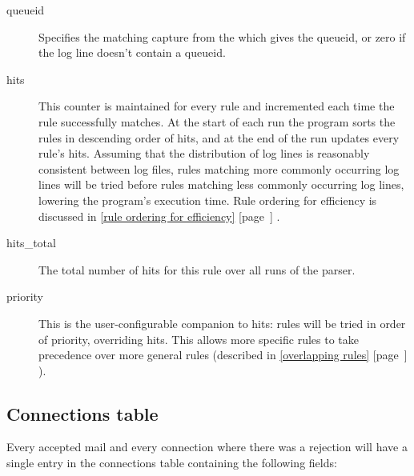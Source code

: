 \documentclass[a4paper,12pt,draft]{article}
\newcommand{\refwithpage}[1]{%
    \empty{}\ref{#1} [page~\pageref{#1}]%
}
\newcommand{\sectionref}[1]{%
    \textsection{}\refwithpage{#1}%
}
\begin{document}
\begin{description}
    \item [queueid] Specifies the matching capture from the \regex{} which
        gives the queueid, or zero if the log line doesn't contain a
        queueid.

    \item [hits] This counter is maintained for every rule and incremented
        each time the rule successfully matches.  At the start of each run
        the program sorts the rules in descending order of hits, and at the
        end of the run updates every rule's hits.  Assuming that the
        distribution of log lines is reasonably consistent between log
        files, rules matching more commonly occurring log lines will be
        tried before rules matching less commonly occurring log lines,
        lowering the program's execution time.  Rule ordering for
        efficiency is discussed in \sectionref{rule ordering for
        efficiency}.

    \item [hits\_total] The total number of hits for this rule over all
        runs of the parser.

    \item [priority] This is the user-configurable companion to hits: rules
        will be tried in order of priority, overriding hits.  This allows
        more specific rules to take precedence over more general rules
        (described in \sectionref{overlapping rules}).

\end{description}


\subsection{Connections table}

\label{connections table}

Every accepted mail and every connection where there was a rejection will
have a single entry in the connections table containing the following
fields:
\end{document}
